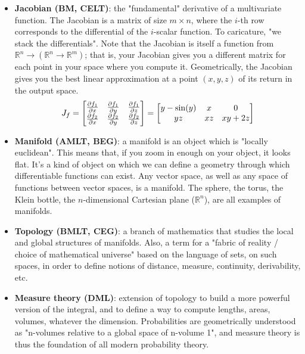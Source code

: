 \documentclass{article}
\begin{document}
\begin{itemize}
	\item \textbf{Jacobian (BM, CELT)}: the "fundamental" derivative of a multivariate function. The Jacobian is a matrix of size $m \times n$, where the $i$-th row corresponds to the differential of the $i$-scalar function. To caricature, "we stack the differentials". Note that the Jacobian is itself a function from $\mathbb{R}^n \rightarrow (\mathbb{R}^n \rightarrow \mathbb{R}^m)$; that is, your Jacobian gives you a different matrix for each point in your space where you compute it. Geometrically, the Jacobian gives you the best linear approximation at a point $(x,y,z)$ of its return in the output space.
	\begin{align*}
		J_f
		=
		\begin{bmatrix}
			\pdv{f_1}{x} & \pdv{f_1}{y} & \pdv{f_1}{z} \\
			\pdv{f_2}{x} & \pdv{f_2}{y} & \pdv{f_2}{z}
		\end{bmatrix}
		=
		\begin{bmatrix}
			y - \sin(y) & x & 0 \\
			yz & xz & xy + 2z
		\end{bmatrix}
	\end{align*}

	\item \textbf{Manifold (AMLT, BEG)}: a manifold is an object which is "locally euclidean". This means that, if you zoom in enough on your object, it looks flat. It's a kind of object on which we can define a geometry through which differentiable functions can exist. Any vector space, as well as any space of functions between vector spaces, is a manifold. The sphere, the torus, the Klein bottle, the $n$-dimensional Cartesian plane ($\mathbb{R}^n$), are all examples of manifolds.

	\item \textbf{Topology (BMLT, CEG)}: a branch of mathematics that studies the local and global structures of manifolds. Also, a term for a "fabric of reality / choice of mathematical universe" based on the language of sets, on such spaces, in order to define notions of distance, measure, continuity, derivability, etc.

	\item \textbf{Measure theory (DML)}: extension of topology to build a more powerful version of the integral, and to define a way to compute lengths, areas, volumes, whatever the dimension. Probabilities are geometrically understood as "n-volumes relative to a global space of n-volume 1", and measure theory is thus the foundation of all modern probability theory.


\end{itemize}
\end{document}
